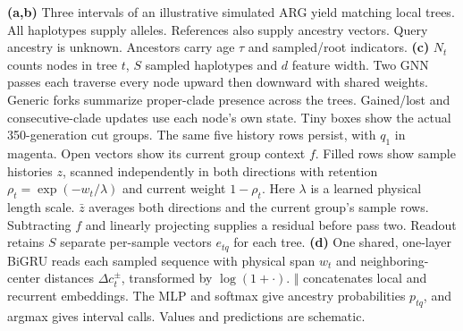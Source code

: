\caption{\textbf{(a,b)} Three intervals of an illustrative simulated ARG yield matching local trees. All haplotypes supply alleles. References also supply ancestry vectors. Query ancestry is unknown. Ancestors carry age $\tau$ and sampled/root indicators. \textbf{(c)} $N_t$ counts nodes in tree $t$, $S$ sampled haplotypes and $d$ feature width. Two GNN passes each traverse every node upward then downward with shared weights. Generic forks summarize proper-clade presence across the trees. Gained/lost and consecutive-clade updates use each node's own state. Tiny boxes show the actual 350-generation cut groups. The same five history rows persist, with $q_1$ in magenta. Open vectors show its current group context $f$. Filled rows show sample histories $z$, scanned independently in both directions with retention $\rho_t=\exp(-w_t/\lambda)$ and current weight $1-\rho_t$. Here $\lambda$ is a learned physical length scale. $\bar z$ averages both directions and the current group's sample rows. Subtracting $f$ and linearly projecting supplies a residual before pass two. Readout retains $S$ separate per-sample vectors $e_{tq}$ for each tree. \textbf{(d)} One shared, one-layer BiGRU reads each sampled sequence with physical span $w_t$ and neighboring-center distances $\Delta c_t^\pm$, transformed by $\log(1+\cdot)$. $\Vert$ concatenates local and recurrent embeddings. The MLP and softmax give ancestry probabilities $p_{tq}$, and argmax gives interval calls. Values and predictions are schematic.}
